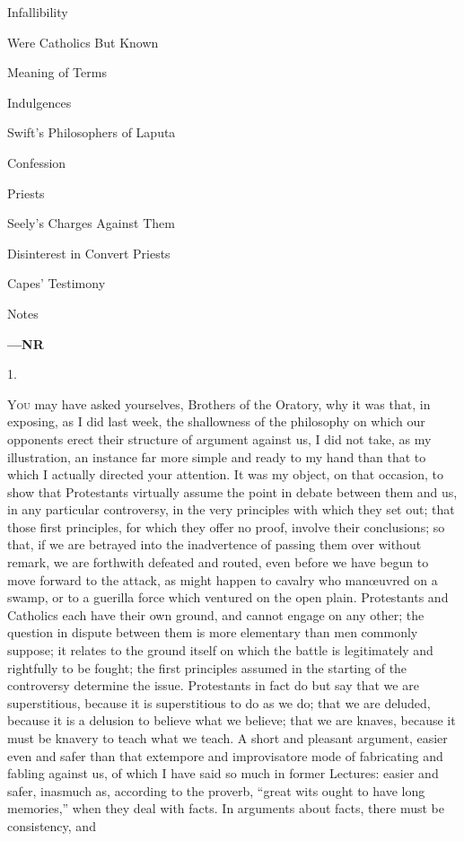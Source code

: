 Infallibility

Were Catholics But Known

Meaning of Terms

Indulgences

Swift's
Philosophers of Laputa

Confession

Priests

Seely's Charges
Against Them

Disinterest in
Convert Priests

Capes' Testimony

Notes

\textbf{—NR}

1.

Y\textsc{ou} may have asked yourselves, Brothers of the
Oratory, why it was that, in exposing, as I did last
week, the shallowness of the philosophy on which our
opponents erect their structure of argument against us, I
did not take, as my illustration, an instance far more
simple and ready to my hand than that to which I actually
directed your attention. It was my object, on that
occasion, to show that Protestants virtually assume the
point in debate between them and us, in any particular
controversy, in the very principles with which they set
out; that those first principles, for which they offer no
proof, involve their conclusions; so that, if we are
betrayed into the inadvertence of passing them over
without remark, we are forthwith defeated and routed,
even before we have begun to move forward to the attack,
as might happen to cavalry who manœuvred on a swamp, or
to a guerilla force which ventured on the open plain.
Protestants and Catholics each have their own ground, and
cannot engage on any other; the question in dispute
between them is more elementary than men commonly
suppose; it relates to the ground itself on which the
battle is legitimately and rightfully to be fought; the
first principles assumed in the starting of the
controversy determine the issue. Protestants in fact do
but say that we are superstitious, because it is
superstitious to do as we do; that we are deluded,
because it is a delusion to believe what we believe; that
we are knaves, because it must be knavery to teach what
we teach. A short and pleasant argument, easier even and
safer than that extempore and improvisatore mode of
fabricating and fabling against us, of which I have said
so much in former Lectures: easier and safer, inasmuch
as, according to the proverb, ``great wits ought to
have long memories,'' when they deal with facts. In
arguments about facts, there must be consistency, and
